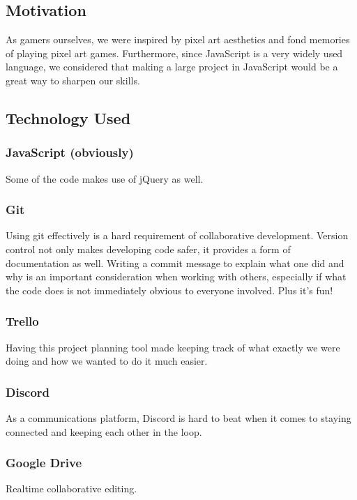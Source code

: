 \documentclass[11pt]{article}
\begin{document}
\subsection{Motivation}
\label{sec:org421220c}
As gamers ourselves, we were inspired by pixel art aesthetics and fond memories of playing pixel art games. Furthermore, since JavaScript is a very widely used language, we considered that making a large project in JavaScript would be a great way to sharpen our skills.\\

\subsection{Technology Used}
\label{sec:orgaa9a1f6}
\subsubsection*{JavaScript (obviously)}
\label{sec:org3e0ce80}
Some of the code makes use of jQuery as well.\\
\subsubsection*{Git}
\label{sec:orga0e6aa6}
Using git effectively is a hard requirement of collaborative development. Version control not only makes developing code safer, it provides a form of documentation as well. Writing a commit message to explain what one did and why is an important consideration when working with others, especially if what the code does is not immediately obvious to everyone involved. Plus it's fun!\\
\subsubsection*{Trello}
\label{sec:orgd10f2a7}
Having this project planning tool made keeping track of what exactly we were doing and how we wanted to do it much easier.\\
\subsubsection*{Discord}
\label{sec:orged003a0}
As a communications platform, Discord is hard to beat when it comes to staying connected and keeping each other in the loop.\\
\subsubsection*{Google Drive}
\label{sec:org4749362}
Realtime collaborative editing.\\
\end{document}
